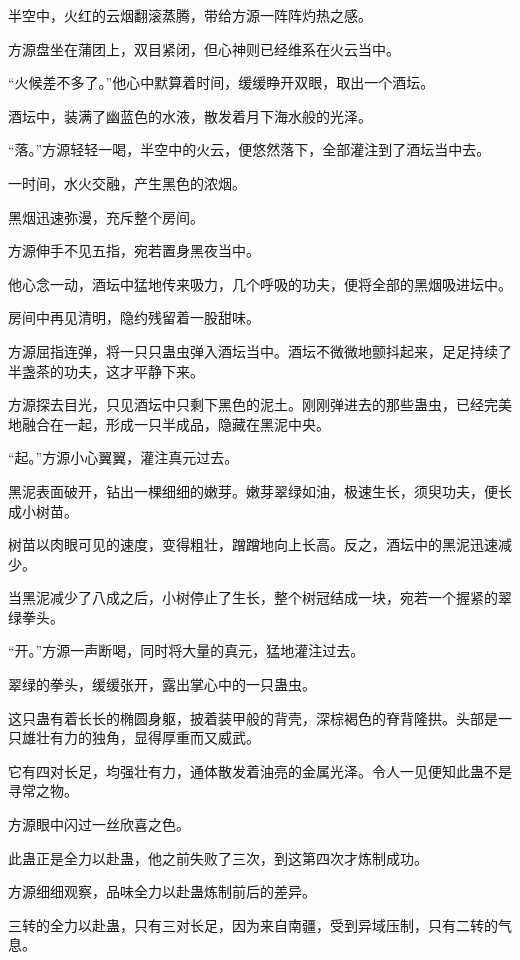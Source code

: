 
\begin{this_body}

半空中，火红的云烟翻滚蒸腾，带给方源一阵阵灼热之感。

方源盘坐在蒲团上，双目紧闭，但心神则已经维系在火云当中。

“火候差不多了。”他心中默算着时间，缓缓睁开双眼，取出一个酒坛。

酒坛中，装满了幽蓝色的水液，散发着月下海水般的光泽。

“落。”方源轻轻一喝，半空中的火云，便悠然落下，全部灌注到了酒坛当中去。

一时间，水火交融，产生黑色的浓烟。

黑烟迅速弥漫，充斥整个房间。

方源伸手不见五指，宛若置身黑夜当中。

他心念一动，酒坛中猛地传来吸力，几个呼吸的功夫，便将全部的黑烟吸进坛中。

房间中再见清明，隐约残留着一股甜味。

方源屈指连弹，将一只只蛊虫弹入酒坛当中。酒坛不微微地颤抖起来，足足持续了半盏茶的功夫，这才平静下来。

方源探去目光，只见酒坛中只剩下黑色的泥土。刚刚弹进去的那些蛊虫，已经完美地融合在一起，形成一只半成品，隐藏在黑泥中央。

“起。”方源小心翼翼，灌注真元过去。

黑泥表面破开，钻出一棵细细的嫩芽。嫩芽翠绿如油，极速生长，须臾功夫，便长成小树苗。

树苗以肉眼可见的速度，变得粗壮，蹭蹭地向上长高。反之，酒坛中的黑泥迅速减少。

当黑泥减少了八成之后，小树停止了生长，整个树冠结成一块，宛若一个握紧的翠绿拳头。

“开。”方源一声断喝，同时将大量的真元，猛地灌注过去。

翠绿的拳头，缓缓张开，露出掌心中的一只蛊虫。

这只蛊有着长长的椭圆身躯，披着装甲般的背壳，深棕褐色的脊背隆拱。头部是一只雄壮有力的独角，显得厚重而又威武。

它有四对长足，均强壮有力，通体散发着油亮的金属光泽。令人一见便知此蛊不是寻常之物。

方源眼中闪过一丝欣喜之色。

此蛊正是全力以赴蛊，他之前失败了三次，到这第四次才炼制成功。

方源细细观察，品味全力以赴蛊炼制前后的差异。

三转的全力以赴蛊，只有三对长足，因为来自南疆，受到异域压制，只有二转的气息。


\end{this_body}
